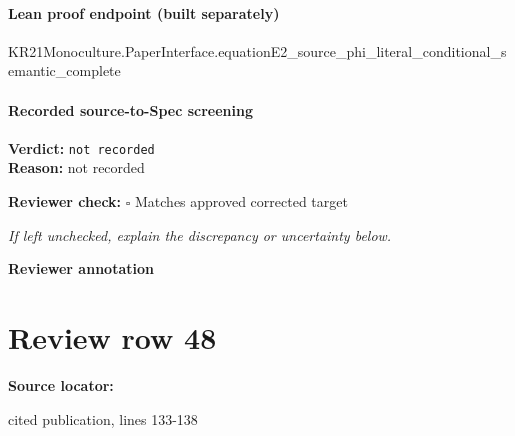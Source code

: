 \documentclass[10pt]{article}
\newcommand{\reviewerbox}{%
  \par\noindent\fbox{\parbox{0.96\linewidth}{\rule{0pt}{0.38in}}}\par
}
\newcommand{\reviewmatch}[1]{%
  \par\noindent\textbf{Reviewer check:} $\square$\; #1\par
  \noindent\emph{If left unchecked, explain the discrepancy or uncertainty below.}\par
}
\begin{document}
\paragraph{Lean proof endpoint (built separately)}\begin{ReviewVerbatim}
KR21Monoculture.PaperInterface.equationE2_source_phi_literal_conditional_semantic_complete
\end{ReviewVerbatim}

\paragraph{Recorded source-to-Spec screening}
\textbf{Verdict:} \texttt{not recorded}
\\
\textbf{Reason:} not recorded
\reviewmatch{Matches approved corrected target}
\noindent\textbf{Reviewer annotation}\par
\reviewerbox
\clearpage
\hypertarget{source-claim-027748e89e133285}{}
\section*{Review row 48}
\textbf{Source locator:} {\footnotesize\raggedright cited publication, lines 133-\allowbreak{}138\par}
\end{document}
